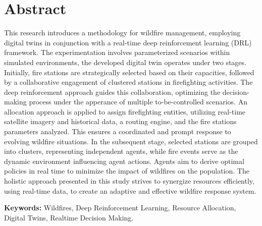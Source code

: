 \documentclass{scspaperproc}
\theoremstyle{scsthe}
\begin{document}
\maketitle

\section*{Abstract}
This research introduces a methodology for wildfire management, employing digital twins in conjunction with a real-time deep reinforcement learning (DRL) framework. The experimentation involves parameterized scenarios within simulated environments, the developed digital twin operates under two stages. Initially, fire stations are strategically selected based on their capacities, followed by a collaborative engagement of clustered stations in firefighting activities. The deep reinforcement approach guides this collaboration, optimizing the decision-making process under the apperance of multiple to-be-controlled scenarios. An allocation approach is applied to assign firefighting entities, utilizing real-time satellite imagery and historical data, a routing engine, and the fire stations parameters analyzed. This ensures a coordinated and prompt response to evolving wildfire situations. In the subsequent stage, selected stations are grouped into clusters, representing independent agents, while fire events serve as the dynamic environment influencing agent actions. Agents aim to derive optimal policies in real time to minimize the impact of wildfires on the population. The holistic approach presented in this study strives to synergize resources efficiently, using real-time data, to create an adaptive and effective wildfire response system.


\textbf{Keywords:} Wildfires, Deep Reinforcement Learning, Resource Allocation, Digital Twins, Realtime Decision Making.
\end{document}
